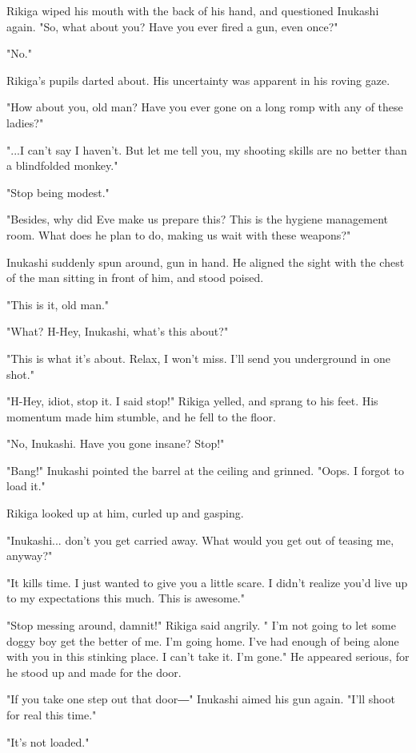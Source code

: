 Rikiga wiped his mouth with the back of his hand, and questioned
Inukashi again. "So, what about you? Have you ever fired a gun, even
once?"

"No."

Rikiga's pupils darted about. His uncertainty was apparent in his roving
gaze.

"How about you, old man? Have you ever gone on a long romp with any of
these ladies?"

"...I can't say I haven't. But let me tell you, my shooting skills are
no better than a blindfolded monkey."

"Stop being modest."

"Besides, why did Eve make us prepare this? This is the hygiene
management room. What does he plan to do, making us wait with these
weapons?"

Inukashi suddenly spun around, gun in hand. He aligned the sight with
the chest of the man sitting in front of him, and stood poised.

"This is it, old man."

"What? H-Hey, Inukashi, what's this about?"

"This is what it's about. Relax, I won't miss. I'll send you underground
in one shot."

"H-Hey, idiot, stop it. I said stop!" Rikiga yelled, and sprang to his
feet. His momentum made him stumble, and he fell to the floor.

"No, Inukashi. Have you gone insane? Stop!"

"Bang!" Inukashi pointed the barrel at the ceiling and grinned. "Oops. I
forgot to load it."

Rikiga looked up at him, curled up and gasping.

"Inukashi... don't you get carried away. What would you get out of
teasing me, anyway?"

"It kills time. I just wanted to give you a little scare. I didn't
realize you'd live up to my expectations this much. This is awesome."

"Stop messing around, damnit!" Rikiga said angrily. " I'm not going to
let some doggy boy get the better of me. I'm going home. I've had enough
of being alone with you in this stinking place. I can't take it. I'm
gone." He appeared serious, for he stood up and made for the door.

"If you take one step out that door―" Inukashi aimed his gun again.
"I'll shoot for real this time."

"It's not loaded."

